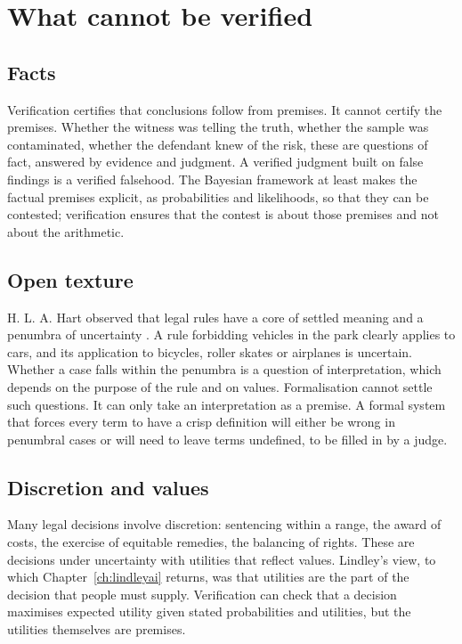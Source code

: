 \section{What cannot be verified}

\subsection{Facts}

Verification certifies that conclusions follow from premises. It cannot certify the premises. Whether the witness was telling the truth, whether the sample was contaminated, whether the defendant knew of the risk, these are questions of fact, answered by evidence and judgment. A verified judgment built on false findings is a verified falsehood. The Bayesian framework at least makes the factual premises explicit, as probabilities and likelihoods, so that they can be contested; verification ensures that the contest is about those premises and not about the arithmetic.

\subsection{Open texture}

H. L. A. Hart observed that legal rules have a core of settled meaning and a penumbra of uncertainty \citep{hart1961}. A rule forbidding vehicles in the park clearly applies to cars, and its application to bicycles, roller skates or airplanes is uncertain. Whether a case falls within the penumbra is a question of interpretation, which depends on the purpose of the rule and on values. Formalisation cannot settle such questions. It can only take an interpretation as a premise. A formal system that forces every term to have a crisp definition will either be wrong in penumbral cases or will need to leave terms undefined, to be filled in by a judge.

\subsection{Discretion and values}

Many legal decisions involve discretion: sentencing within a range, the award of costs, the exercise of equitable remedies, the balancing of rights. These are decisions under uncertainty with utilities that reflect values. Lindley's view, to which Chapter~\ref{ch:lindleyai} returns, was that utilities are the part of the decision that people must supply. Verification can check that a decision maximises expected utility given stated probabilities and utilities, but the utilities themselves are premises.

